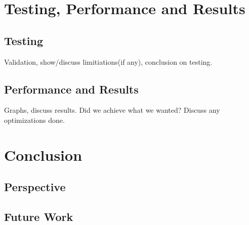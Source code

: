 \documentclass[10pt,a4paper,onesided]{article}
\begin{document}
\section{Testing, Performance and Results}
\subsection{Testing}
Validation, show/discuss limitiations(if any), conclusion on testing.
\subsection{Performance and Results}
Graphs, discuss results. Did we achieve what we wanted? Discuss any
optimizations done.

\section{Conclusion}
\subsection{Perspective}
\subsection{Future Work}
\end{document}

